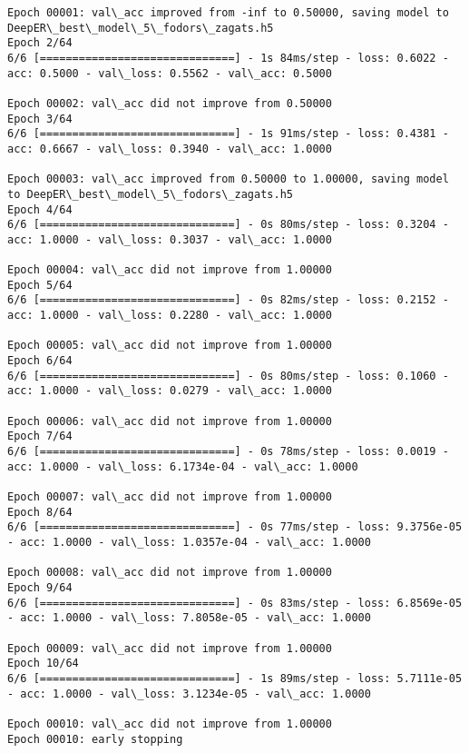 \documentclass[11pt]{article}
\begin{document}
\begin{Verbatim}[commandchars=\\\{\}]
Epoch 00001: val\_acc improved from -inf to 0.50000, saving model to DeepER\_best\_model\_5\_fodors\_zagats.h5
Epoch 2/64
6/6 [==============================] - 1s 84ms/step - loss: 0.6022 - acc: 0.5000 - val\_loss: 0.5562 - val\_acc: 0.5000

Epoch 00002: val\_acc did not improve from 0.50000
Epoch 3/64
6/6 [==============================] - 1s 91ms/step - loss: 0.4381 - acc: 0.6667 - val\_loss: 0.3940 - val\_acc: 1.0000

Epoch 00003: val\_acc improved from 0.50000 to 1.00000, saving model to DeepER\_best\_model\_5\_fodors\_zagats.h5
Epoch 4/64
6/6 [==============================] - 0s 80ms/step - loss: 0.3204 - acc: 1.0000 - val\_loss: 0.3037 - val\_acc: 1.0000

Epoch 00004: val\_acc did not improve from 1.00000
Epoch 5/64
6/6 [==============================] - 0s 82ms/step - loss: 0.2152 - acc: 1.0000 - val\_loss: 0.2280 - val\_acc: 1.0000

Epoch 00005: val\_acc did not improve from 1.00000
Epoch 6/64
6/6 [==============================] - 0s 80ms/step - loss: 0.1060 - acc: 1.0000 - val\_loss: 0.0279 - val\_acc: 1.0000

Epoch 00006: val\_acc did not improve from 1.00000
Epoch 7/64
6/6 [==============================] - 0s 78ms/step - loss: 0.0019 - acc: 1.0000 - val\_loss: 6.1734e-04 - val\_acc: 1.0000

Epoch 00007: val\_acc did not improve from 1.00000
Epoch 8/64
6/6 [==============================] - 0s 77ms/step - loss: 9.3756e-05 - acc: 1.0000 - val\_loss: 1.0357e-04 - val\_acc: 1.0000

Epoch 00008: val\_acc did not improve from 1.00000
Epoch 9/64
6/6 [==============================] - 0s 83ms/step - loss: 6.8569e-05 - acc: 1.0000 - val\_loss: 7.8058e-05 - val\_acc: 1.0000

Epoch 00009: val\_acc did not improve from 1.00000
Epoch 10/64
6/6 [==============================] - 1s 89ms/step - loss: 5.7111e-05 - acc: 1.0000 - val\_loss: 3.1234e-05 - val\_acc: 1.0000

Epoch 00010: val\_acc did not improve from 1.00000
Epoch 00010: early stopping


\end{Verbatim}
\end{document}
